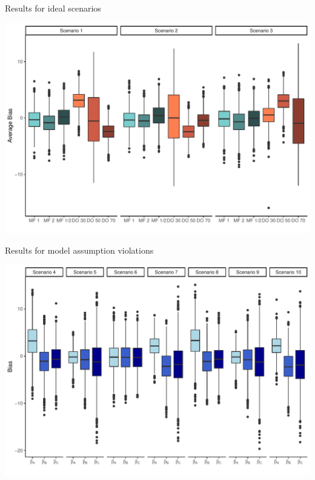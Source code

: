\documentclass[pdftex]{beamer}
\begin{document}
\begin{frame}{Results for ideal scenarios}
\begin{center}
\includegraphics[scale=.5]{idealscen.pdf}
\end{center}
\end{frame}

\begin{frame}{Results for model assumption violations}
\begin{center}
\includegraphics[scale=.5]{assumpviol.pdf}
\end{center}
\end{frame}
\end{document}
